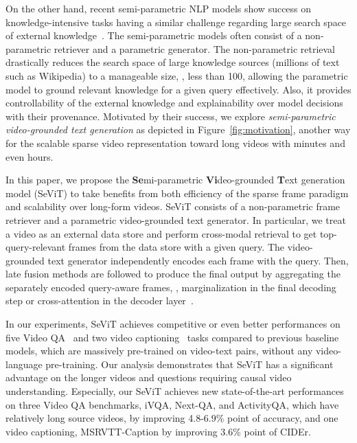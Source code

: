 \documentclass{article}
\newcommand{\frameworkname}{SeViT}
\begin{document}
On the other hand, recent semi-parametric NLP models show success on knowledge-intensive tasks having a similar challenge regarding large search space of external knowledge~\cite{lewis2020retrieval, izacard2021leveraging}. The semi-parametric models often consist of a non-parametric retriever and a parametric generator. The non-parametric retrieval drastically reduces the search space of large knowledge sources (millions of text such as Wikipedia) to a manageable size, \eg, less than 100, allowing the parametric model to ground relevant knowledge for a given query effectively. Also, it provides controllability of the external knowledge and explainability over model decisions with their provenance. Motivated by their success, we explore \textit{semi-parametric video-grounded text generation} as depicted in Figure~\ref{fig:motivation}, another way for the scalable sparse video representation toward long videos with minutes and even hours.

In this paper, we propose the \textbf{Se}mi-parametric \textbf{Vi}deo-grounded \textbf{T}ext generation model (\frameworkname{}) to take benefits from both efficiency of the sparse frame paradigm and scalability over long-form videos. \frameworkname{} consists of a non-parametric frame retriever and a parametric video-grounded text generator. In particular, we treat a video as an external data store and perform cross-modal retrieval to get top- query-relevant frames from the data store with a given query. The video-grounded text generator independently encodes each frame with the query. Then, late fusion methods are followed to produce the final output by aggregating the separately encoded query-aware frames, \eg, marginalization in the final decoding step or cross-attention in the decoder layer~\cite{lewis2020retrieval, izacard2021leveraging}.

In our experiments, \frameworkname{} achieves competitive or even better performances on five Video QA~\cite{xu2017video, yu2019activitynet, yang2021just, xiao2021next} and two video captioning~\cite{chen2011collecting, xu2016msr} tasks compared to previous baseline models, which are massively pre-trained on video-text pairs, without any video-language pre-training. Our analysis demonstrates that \frameworkname{} has a significant advantage on the longer videos and questions requiring causal video understanding. Especially, our \frameworkname{} achieves new state-of-the-art performances on three Video QA benchmarks, iVQA, Next-QA, and ActivityQA, which have relatively long source videos, by improving 4.8-6.9\% point of accuracy, and one video captioning, MSRVTT-Caption by improving 3.6\% point of CIDEr.
\end{document}
